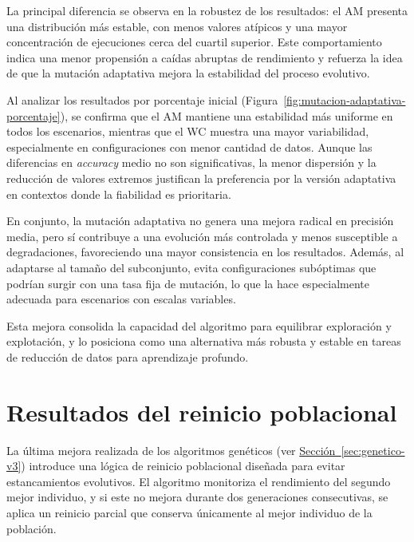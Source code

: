La principal diferencia se observa en la robustez de los resultados: el AM presenta una distribución más estable,
con menos valores atípicos y una mayor concentración de ejecuciones cerca del cuartil superior.
Este comportamiento indica una menor propensión a caídas abruptas de rendimiento y refuerza la idea de que la mutación
adaptativa mejora la estabilidad del proceso evolutivo.

Al analizar los resultados por porcentaje inicial (Figura~\ref{fig:mutacion-adaptativa-porcentaje}),
se confirma que el AM mantiene una estabilidad más uniforme en todos los escenarios, mientras que el WC muestra una mayor variabilidad,
especialmente en configuraciones con menor cantidad de datos.
Aunque las diferencias en \textit{accuracy} medio no son significativas, la menor dispersión y la reducción de valores extremos justifican la
preferencia por la versión adaptativa en contextos donde la fiabilidad es prioritaria.

En conjunto, la mutación adaptativa no genera una mejora radical en precisión media,
pero sí contribuye a una evolución más controlada y menos susceptible a degradaciones, favoreciendo una mayor consistencia en los resultados.
Además, al adaptarse al tamaño del subconjunto, evita configuraciones subóptimas que podrían surgir con una tasa fija de mutación,
lo que la hace especialmente adecuada para escenarios con escalas variables.

Esta mejora consolida la capacidad del algoritmo para equilibrar exploración y explotación,
y lo posiciona como una alternativa más robusta y estable en tareas de reducción de datos para aprendizaje profundo.


\section{Resultados del reinicio poblacional}\label{sec:resultados-reinicio-poblacional}
La última mejora realizada de los algoritmos genéticos (ver \hyperref[sec:genetico-v3]{Sección~\ref*{sec:genetico-v3}})
introduce una lógica de reinicio poblacional diseñada para evitar estancamientos evolutivos.
El algoritmo monitoriza el rendimiento del segundo mejor individuo, y si este no mejora durante dos generaciones consecutivas,
se aplica un reinicio parcial que conserva únicamente al mejor individuo de la población.


